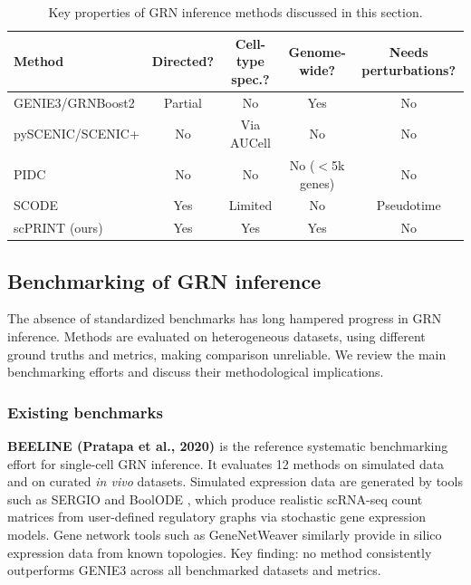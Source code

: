 \begin{table}[ht]
\centering
\scriptsize
\setlength{\tabcolsep}{5pt}
\begin{tabular}{lcccc}
\toprule
\textbf{Method} & \textbf{Directed?} & \textbf{Cell-type spec.?} & \textbf{Genome-wide?} & \textbf{Needs perturbations?} \\
\midrule
GENIE3/GRNBoost2 & Partial & No & Yes & No \\
pySCENIC/SCENIC+ & No & Via AUCell & No & No \\
PIDC & No & No & No ($<$5k genes) & No \\
SCODE & Yes & Limited & No & Pseudotime \\
scPRINT (ours) & Yes & Yes & Yes & No \\
\bottomrule
\end{tabular}
\caption[Comparison of GRN inference methods]{Key properties of GRN inference methods discussed in this section.}
\label{tab:grn_methods}
\end{table}

\subsection{Benchmarking of GRN inference}

The absence of standardized benchmarks has long hampered progress in \gls{GRN} inference. Methods
are evaluated on heterogeneous datasets, using different ground truths and metrics, making
comparison unreliable. We review the main benchmarking efforts and discuss their methodological
implications.

\subsubsection{Existing benchmarks}
\textbf{BEELINE (Pratapa et al., 2020) \cite{pratapaBenchmarkingAlgorithmsGene2020}} is the
reference systematic benchmarking effort for single-cell \gls{GRN} inference. It evaluates 12 methods
on simulated data and on curated \textit{in vivo} datasets. Simulated expression data are generated
by tools such as SERGIO \cite{dibaeiniaSERGIOSingleCellExpression2020} and BoolODE
\cite{pratapaBenchmarkingAlgorithmsGene2020}, which produce realistic \gls{scRNA-seq} count matrices
from user-defined regulatory graphs via stochastic gene expression models. Gene network tools such
as GeneNetWeaver \cite{schaffterGeneNetWeaverNetworkTopology2011} similarly provide
in silico expression data from known topologies. Key finding: no method consistently
outperforms GENIE3 across all benchmarked datasets and metrics.

